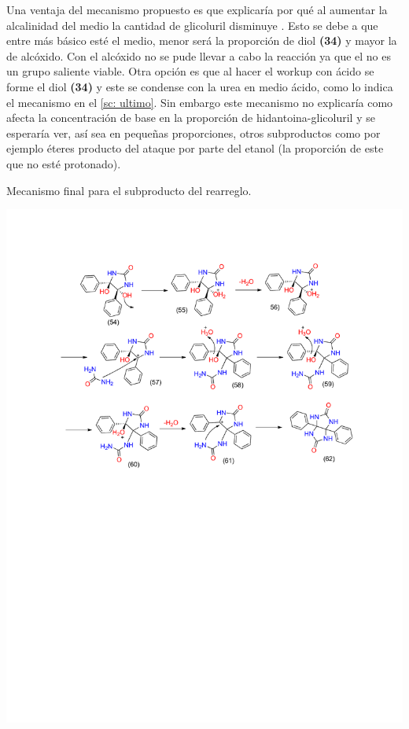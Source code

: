 \documentclass[fleqn,10pt]{SelfArx}
\begin{document}
Una ventaja del mecanismo propuesto es que explicaría por qué al aumentar la alcalinidad del medio la cantidad de glicoluril disminuye \cite{dunnavant1956}. Esto se debe a que entre más básico esté el medio, menor será la proporción de diol \textbf{(34)} y mayor la de alcóxido. Con el alcóxido no se pude llevar a cabo la reacción ya que el  no es un grupo saliente viable. Otra opción es que al hacer el workup con ácido se forme el diol \textbf{(34)} y este se condense con la urea en medio ácido, como lo indica el mecanismo en el \autoref{sc: ultimo}. Sin embargo este mecanismo no explicaría como afecta la concentración de base en la proporción de hidantoina-glicoluril y se esperaría ver, así sea en pequeñas proporciones, otros subproductos como por ejemplo éteres producto del ataque por parte del etanol (la proporción de este que no esté protonado).
\begin{scheme}[h]
	\centering
	\caption{Mecanismo final para el subproducto del rearreglo.}
	\label{sc: ultimo}
	\includegraphics[width=\linewidth]{structures/subproducto_ultimo_esquema.pdf}
\end{scheme}
\end{document}
